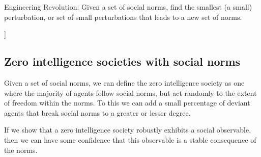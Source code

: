 \documentclass[a4paper]{article}
\begin{document}
Engineering Revolution: Given a set of social norms, find the smallest (a small) perturbation, or set of small perturbations that leads to a new set of norms.

]


\subsection{Zero intelligence societies with social norms}

Given a set of social norms, we can define the zero intelligence society as one where the majority of agents follow social norms, but act randomly to the extent of freedom within the norms. To this we can add a small percentage of deviant agents that break social norms to a greater or lesser degree.

If we show that a zero intelligence society robustly exhibits a social observable, then we can have some confidence that this observable is a stable consequence of the norms.



\end{document}

